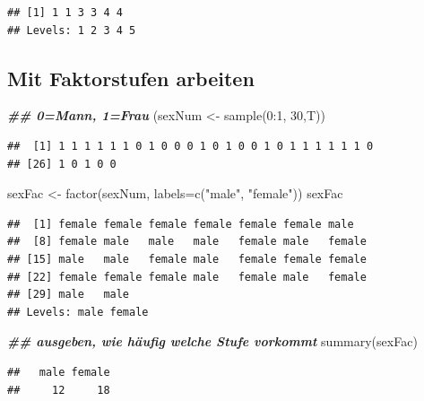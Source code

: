 \documentclass[
]{book}
\newenvironment{Shaded}{\begin{snugshade}}{\end{snugshade}}
\newcommand{\AttributeTok}[1]{\textcolor[rgb]{0.77,0.63,0.00}{#1}}
\newcommand{\DecValTok}[1]{\textcolor[rgb]{0.00,0.00,0.81}{#1}}
\newcommand{\DocumentationTok}[1]{\textcolor[rgb]{0.56,0.35,0.01}{\textbf{\textit{#1}}}}
\newcommand{\FunctionTok}[1]{\textcolor[rgb]{0.00,0.00,0.00}{#1}}
\newcommand{\NormalTok}[1]{#1}
\newcommand{\OtherTok}[1]{\textcolor[rgb]{0.56,0.35,0.01}{#1}}
\newcommand{\SpecialCharTok}[1]{\textcolor[rgb]{0.00,0.00,0.00}{#1}}
\newcommand{\StringTok}[1]{\textcolor[rgb]{0.31,0.60,0.02}{#1}}
\begin{document}
\begin{verbatim}
## [1] 1 1 3 3 4 4
## Levels: 1 2 3 4 5
\end{verbatim}

\hypertarget{mit-faktorstufen-arbeiten}{%
\subsection{Mit Faktorstufen arbeiten}\label{mit-faktorstufen-arbeiten}}

\begin{Shaded}
\begin{Highlighting}[]
\DocumentationTok{\#\# 0=Mann, 1=Frau}
\NormalTok{(sexNum }\OtherTok{\textless{}{-}} \FunctionTok{sample}\NormalTok{(}\DecValTok{0}\SpecialCharTok{:}\DecValTok{1}\NormalTok{, }\DecValTok{30}\NormalTok{,T)) }
\end{Highlighting}
\end{Shaded}

\begin{verbatim}
##  [1] 1 1 1 1 1 1 0 1 0 0 0 1 0 1 0 0 1 0 1 1 1 1 1 1 0
## [26] 1 0 1 0 0
\end{verbatim}

\begin{Shaded}
\begin{Highlighting}[]
\NormalTok{sexFac }\OtherTok{\textless{}{-}} \FunctionTok{factor}\NormalTok{(sexNum, }\AttributeTok{labels=}\FunctionTok{c}\NormalTok{(}\StringTok{"male"}\NormalTok{, }\StringTok{"female"}\NormalTok{))}
\NormalTok{sexFac}
\end{Highlighting}
\end{Shaded}

\begin{verbatim}
##  [1] female female female female female female male  
##  [8] female male   male   male   female male   female
## [15] male   male   female male   female female female
## [22] female female female male   female male   female
## [29] male   male  
## Levels: male female
\end{verbatim}

\begin{Shaded}
\begin{Highlighting}[]
\DocumentationTok{\#\# ausgeben, wie häufig welche Stufe vorkommt}
\FunctionTok{summary}\NormalTok{(sexFac)}
\end{Highlighting}
\end{Shaded}

\begin{verbatim}
##   male female 
##     12     18
\end{verbatim}
\end{document}
